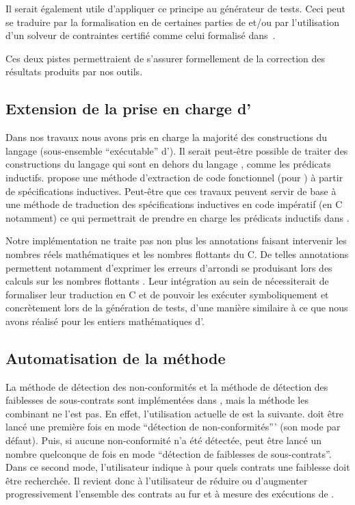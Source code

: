 Il serait également utile d'appliquer ce principe au générateur de tests.
Ceci peut se traduire par la formalisation en \coq de certaines parties de
\pathcrawler et/ou par l'utilisation d'un solveur de contraintes certifié comme
celui formalisé dans~\cite{Carlier/FM12}.

Ces deux pistes permettraient de s'assurer formellement de la correction
des résultats produits par nos outils.


\subsection{Extension de la prise en charge d'\acsl}


Dans nos travaux nous avons pris en charge la majorité des constructions du
langage \eacsl (sous-ensemble ``exécutable'' d'\acsl).
Il serait peut-être possible de traiter des constructions du langage \acsl qui
sont en dehors du langage \eacsl, comme les prédicats inductifs.
\cite{Tollitte/CPP12} propose une méthode d'extraction de code fonctionnel
(pour \coq) à partir de spécifications inductives.
Peut-être que ces travaux peuvent servir de base à une méthode de traduction
des spécifications inductives en code impératif (en C notamment) ce qui
permettrait de prendre en charge les prédicats inductifs dans \stady.

Notre implémentation ne traite pas non plus les annotations faisant intervenir
les nombres réels mathématiques et les nombres flottants du C.
De telles annotations permettent notamment d'exprimer les erreurs d'arrondi
se produisant lors des calculs sur les nombres flottants
\cite{Goubault/VMCAI11}.
Leur intégration au sein de \stady nécessiterait de formaliser leur traduction
en C et de pouvoir les exécuter symboliquement et concrètement lors de la
génération de tests, d'une manière similaire à ce que nous avons réalisé pour
les entiers mathématiques d'\eacsl.


\subsection{Automatisation de la méthode}


La méthode de détection des non-conformités et la méthode de détection des
faiblesses de sous-contrats sont implémentées dans \stady, mais la méthode les
combinant ne l'est pas.
En effet, l'utilisation actuelle de \stady est la suivante.
\stady doit être lancé une première fois en mode
``détection de non-conformités''' (son mode par défaut).
Puis, si aucune non-conformité n'a été détectée, \stady peut être lancé un
nombre quelconque de fois en mode ``détection de faiblesses de sous-contrats''.
Dans ce second mode, l'utilisateur indique à \stady pour quels contrats une
faiblesse doit être recherchée.
Il revient donc à l'utilisateur de réduire ou d'augmenter progressivement
l'ensemble des contrats au fur et à mesure des exécutions de \stady.

